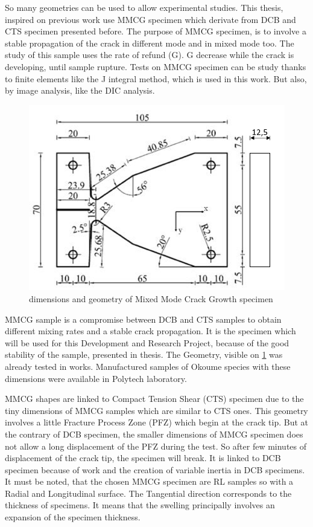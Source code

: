 So many geometries can be used to allow experimental studies. This thesis, inspired on previous work use MMCG specimen which derivate from DCB and CTS specimen presented before. The purpose of MMCG specimen, \parencite{Reference6} is to involve a stable propagation of the crack in different mode and in mixed mode too. The study of this sample uses the rate of refund (G). G decrease while the crack is developing, until sample rupture. Tests on MMCG specimen can be study thanks to finite elements like the J integral method, which is used in this work. But also, by image analysis, like the DIC analysis.
\begin{figure}[th]
	\centering
	\includegraphics[scale=0.5]{Figures/MMCG_specimen}
	\decoRule
	\caption[MMCG specimen]{dimensions and geometry of Mixed Mode Crack Growth specimen}
	\label{fig:Fig5}
\end{figure}
MMCG sample is a compromise between DCB and CTS samples to obtain different mixing rates and a stable crack propagation. It is the specimen which will be used for this Development and Research Project, because of the good stability of the sample, presented in \parencite{Reference6} thesis. The Geometry, visible on \ref{fig:Fig5} was already tested in \parencite{Reference7} works. Manufactured samples of Okoume species with these dimensions were available in Polytech laboratory.

MMCG shapes are linked to Compact Tension Shear (CTS) specimen due to the tiny dimensions of MMCG samples which are similar to CTS ones. This geometry involves a little Fracture Process Zone (PFZ) which begin at the crack tip. But at the contrary of DCB specimen, the smaller dimensions of MMCG specimen does not allow a long displacement of the PFZ during the test. So after few minutes of displacement of the crack tip, the specimen will break. It is linked to DCB specimen because of \parencite{Reference10} work and the creation of variable inertia in DCB specimens. It must be noted, that the chosen MMCG specimen are RL samples so with a Radial and Longitudinal surface. The Tangential direction corresponds to the thickness of specimens. It means that the  swelling principally involves an expansion of the specimen thickness.

